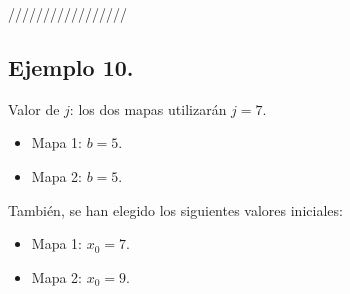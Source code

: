 \documentclass[10pt]{IEEEtran}
\begin{document}
/////////////////

\subsection{Ejemplo 10.}
Valor de $j$: los dos mapas utilizarán $j=7$. 

\begin{itemize}
\item Mapa 1: $b =  5$.
\item Mapa 2: $b =  5$.
\end{itemize}

También, se han elegido los siguientes valores iniciales:

\begin{itemize}
\item Mapa 1: $x_{0} = 7$.
\item Mapa 2: $x_{0} = 9$.
\end{itemize}
\end{document}
